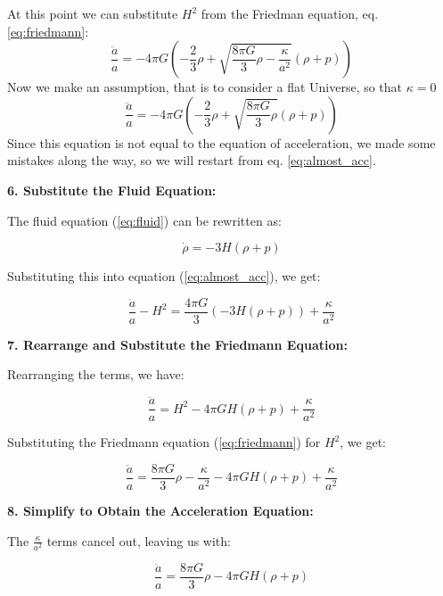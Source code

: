 \documentclass{article}
\begin{document}
At this point we can substitute $H^2$ from the Friedman equation, eq. \ref{eq:friedmann}:
\begin{equation}
\frac{\ddot{a}}{a} = -4\pi G \left( -\frac{2}{3}\rho + \sqrt{\frac{8\pi G}{3}\rho - \frac{\kappa}{a^2}}(\rho + p) \right)
\end{equation}
Now we make an assumption, that is to consider a flat Universe, so that $\kappa = 0$
\begin{equation}
\frac{\ddot{a}}{a} = -4\pi G \left( -\frac{2}{3}\rho + \sqrt{\frac{8\pi G}{3}\rho}(\rho + p) \right)
\end{equation}
Since this equation is not equal to the equation of acceleration, we made some mistakes along the way, so we will restart from eq. \ref{eq:almost_acc}.

\textbf{6. Substitute the Fluid Equation:}

The fluid equation (\ref{eq:fluid}) can be rewritten as:

\begin{equation}
    \dot{\rho} = -3H(\rho + p)
\end{equation}

Substituting this into equation (\ref{eq:almost_acc}), we get:

\begin{equation}
\frac{\ddot{a}}{a} - H^2 = \frac{4\pi G}{3} (-3H(\rho + p)) + \frac{\kappa}{a^2}
\end{equation}

\textbf{7. Rearrange and Substitute the Friedmann Equation:}

Rearranging the terms, we have:

\begin{equation}
\frac{\ddot{a}}{a} = H^2 - 4\pi G H(\rho + p) + \frac{\kappa}{a^2}
\end{equation}

Substituting the Friedmann equation (\ref{eq:friedmann}) for $H^2$, we get:

\begin{equation}
\frac{\ddot{a}}{a} = \frac{8\pi G}{3}\rho - \frac{\kappa}{a^2} - 4\pi G H(\rho + p) + \frac{\kappa}{a^2}
\end{equation}

\textbf{8. Simplify to Obtain the Acceleration Equation:}

The $\frac{\kappa}{a^2}$ terms cancel out, leaving us with:

\begin{equation}
\frac{\ddot{a}}{a} = \frac{8\pi G}{3}\rho - 4\pi G H(\rho + p)
\end{equation}
\end{document}
